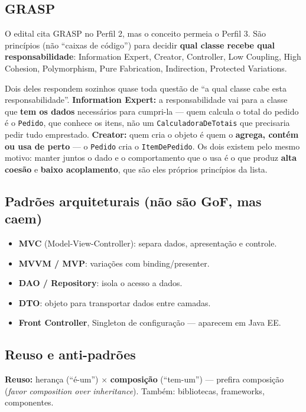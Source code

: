 \subsection{GRASP}

O edital cita GRASP no Perfil 2, mas o conceito permeia o Perfil 3. São
princípios (não ``caixas de código'') para decidir \textbf{qual classe recebe
qual responsabilidade}: Information Expert, Creator, Controller, Low
Coupling, High Cohesion, Polymorphism, Pure Fabrication, Indirection,
Protected Variations.

Dois deles respondem sozinhos quase toda questão de ``a qual classe cabe esta
responsabilidade''. \textbf{Information Expert:} a responsabilidade vai para a
classe que \textbf{tem os dados} necessários para cumpri-la --- quem calcula o
total do pedido é o \texttt{Pedido}, que conhece os itens, não um
\texttt{CalculadoraDeTotais} que precisaria pedir tudo emprestado.
\textbf{Creator:} quem cria o objeto é quem o \textbf{agrega, contém ou usa de
perto} --- o \texttt{Pedido} cria o \texttt{ItemDePedido}. Os dois existem pelo
mesmo motivo: manter juntos o dado e o comportamento que o usa é o que produz
\textbf{alta coesão} e \textbf{baixo acoplamento}, que são eles próprios
princípios da lista.

\subsection{Padrões arquiteturais (não são GoF, mas caem)}

\begin{itemize}
\item \textbf{MVC} (Model-View-Controller): separa dados, apresentação e
controle.
\item \textbf{MVVM / MVP}: variações com binding/presenter.
\item \textbf{DAO / Repository}: isola o acesso a dados.
\item \textbf{DTO}: objeto para transportar dados entre camadas.
\item \textbf{Front Controller}, Singleton de configuração --- aparecem em
Java EE.
\end{itemize}

\subsection{Reuso e anti-padrões}

\textbf{Reuso:} herança (``é-um'') $\times$ \textbf{composição} (``tem-um'')
--- prefira composição (\emph{favor composition over inheritance}). Também:
bibliotecas, frameworks, componentes.

